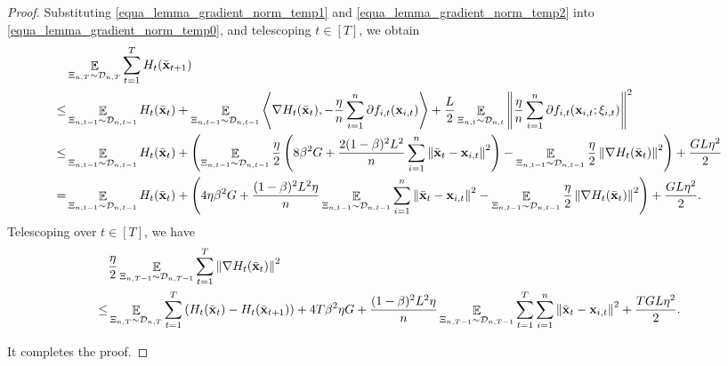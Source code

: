 \documentclass{article}
\begin{document}
\begin{proof}
Substituting \eqref{equa_lemma_gradient_norm_temp1} and \eqref{equa_lemma_gradient_norm_temp2} into \eqref{equa_lemma_gradient_norm_temp0}, and telescoping $t\in[T]$, we obtain
\begin{align}
\nonumber
& \mathop{\mathbb{E}}_{ \Xi_{n,T} \sim \mathcal{D}_{n,T} } \sum_{t=1}^T H_t(\bar{{\bf x}}_{t+1}) \\ \nonumber
\le & \mathop{\mathbb{E}}_{ \Xi_{n,t-1} \sim \mathcal{D}_{n,t-1} } H_t(\bar{{\bf x}}_t) + \mathop{\mathbb{E}}_{ \Xi_{n,t-1} \sim \mathcal{D}_{n,t-1} }\left\langle\nabla H_t(\bar{{\bf x}}_t), -\frac{\eta}{n}\sum_{i=1}^n \partial f_{i,t}({\bf x}_{i,t}) \right\rangle + \frac{L}{2} \mathop{\mathbb{E}}_{ \Xi_{n,t} \sim \mathcal{D}_{n,t} }\left\lVert\frac{\eta}{n}\sum_{i=1}^n \partial f_{i,t}({\bf x}_{i,t};\xi_{i,t})\right\rVert^2 \\ \nonumber
\le & \mathop{\mathbb{E}}_{ \Xi_{n,t-1} \sim \mathcal{D}_{n,t-1} } H_t(\bar{{\bf x}}_t) + \left(  \mathop{\mathbb{E}}_{ \Xi_{n,t-1} \sim \mathcal{D}_{n,t-1} } \frac{\eta}{2}\left(  8\beta^2 G + \frac{2(1-\beta)^2L^2}{n}\sum_{i=1}^n \left\lVert \bar{{\bf x}}_t - {\bf x}_{i,t} \right\rVert^2  \right)  - \mathop{\mathbb{E}}_{ \Xi_{n,t-1} \sim \mathcal{D}_{n,t-1} } \frac{\eta}{2} \left\lVert\nabla H_t(\bar{{\bf x}}_t)\right\rVert^2  \right) + \frac{GL\eta^2}{2} \\ \nonumber
= & \mathop{\mathbb{E}}_{ \Xi_{n,t-1} \sim \mathcal{D}_{n,t-1} } H_t(\bar{{\bf x}}_t) + \left(   4\eta\beta^2 G + \frac{(1-\beta)^2L^2 \eta}{n}\mathop{\mathbb{E}}_{ \Xi_{n,t-1} \sim \mathcal{D}_{n,t-1} }\sum_{i=1}^n \left\lVert \bar{{\bf x}}_t - {\bf x}_{i,t} \right\rVert^2   - \mathop{\mathbb{E}}_{ \Xi_{n,t-1} \sim \mathcal{D}_{n,t-1} } \frac{\eta}{2} \left\lVert\nabla H_t(\bar{{\bf x}}_t)\right\rVert^2  \right) + \frac{GL\eta^2}{2}.
\end{align} Telescoping over $t\in[T]$, we have
\begin{align}
& \frac{\eta}{2} \mathop{\mathbb{E}}_{ \Xi_{n,T-1} \sim \mathcal{D}_{n,T-1} }\sum_{t=1}^T \left\lVert\nabla H_t(\bar{{\bf x}}_t)\right\rVert^2 \\ \nonumber
\le & \mathop{\mathbb{E}}_{ \Xi_{n,T} \sim \mathcal{D}_{n,T} } \sum_{t=1}^T  \left( H_t(\bar{{\bf x}}_t) - H_t(\bar{{\bf x}}_{t+1}) \right) + 4T\beta^2 \eta G + \frac{(1-\beta)^2L^2 \eta}{n}\mathop{\mathbb{E}}_{ \Xi_{n,T-1} \sim \mathcal{D}_{n,T-1} }\sum_{t=1}^T\sum_{i=1}^n \left\lVert \bar{{\bf x}}_t - {\bf x}_{i,t} \right\rVert^2 + \frac{TGL\eta^2}{2}.
\end{align} 





It completes the proof.
\end{proof}
\end{document}
